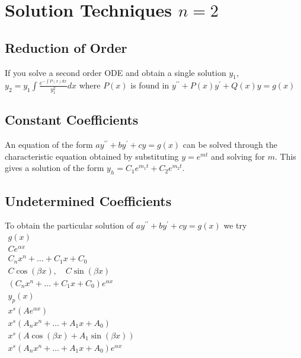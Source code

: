 \documentclass[10pt,landscape,letterpaper]{cheatsheet}
\begin{document}
\section*{Solution Techniques $n=2$}
\subsection*{Reduction of Order}
If you solve a second order ODE and obtain a single solution $y_1$, $y_2=y_1\int \frac{e^{-\int P(x)dx}}{y_1^2}dx$ where $P(x)$ is found in $y^{\prime\prime}+P(x)y^{\prime}+Q(x)y=g(x)$
\subsection*{Constant Coefficients}
An equation of the form $ay^{\prime\prime}+by^{\prime}+cy=g(x)$ can be solved through the characteristic equation obtained by substituting $y=e^{mt}$ and solving for $m$.
This gives a solution of the form $y_h=C_1e^{m_1t}+C_2e^{m_2t}$.
\subsection*{Undetermined Coefficients}
To obtain the particular solution of $ay^{\prime\prime}+by^{\prime}+cy=g(x)$ we try 
$
        \begin{array}{|c|}
                g(x)                                                                  \\ 
                \hline
                Ce^{\alpha x}                                                         \\
                C_nx^n+\dots+C_1x+C_0                                                 \\
                C\cos\left(\beta x\right), \quad C\sin\left(\beta x\right)            \\
                \left(C_nx^n+\dots+C_1x+C_0\right)e^{\alpha x}                        \\
                \hline
                y_p(x)                                                                \\
                x^s\left(Ae^{\alpha x}\right)                                         \\
                x^s\left(A_nx^n+\dots+A_1x+A_0\right)                                 \\
                x^s\left(A\cos\left(\beta x\right)+A_1\sin\left(\beta x\right)\right) \\
                x^s\left(A_nx^n+\dots+A_1x+A_0\right)e^{\alpha x}                     
        \end{array}
$
\end{document}
